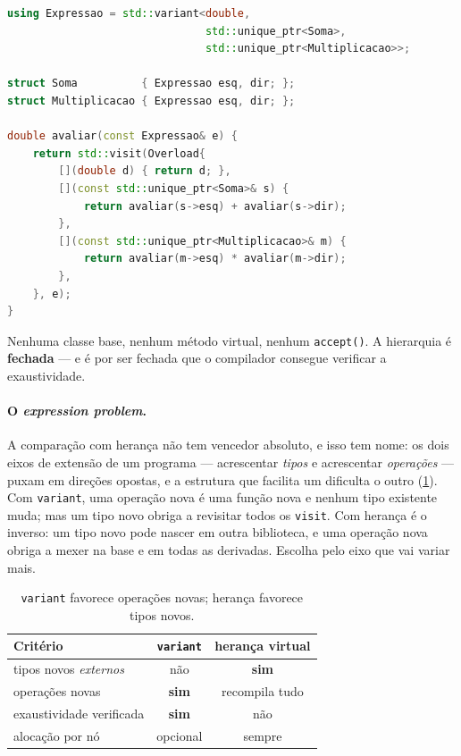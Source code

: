 \begin{lstlisting}[style=bt, language=C++,
    caption={Uma árvore de expressão sem uma única função virtual, em
             \texttt{src/vocabulary\_types/demo\_variant.hpp}.}]
using Expressao = std::variant<double,
                               std::unique_ptr<Soma>,
                               std::unique_ptr<Multiplicacao>>;

struct Soma          { Expressao esq, dir; };
struct Multiplicacao { Expressao esq, dir; };

double avaliar(const Expressao& e) {
    return std::visit(Overload{
        [](double d) { return d; },
        [](const std::unique_ptr<Soma>& s) {
            return avaliar(s->esq) + avaliar(s->dir);
        },
        [](const std::unique_ptr<Multiplicacao>& m) {
            return avaliar(m->esq) * avaliar(m->dir);
        },
    }, e);
}
\end{lstlisting}

Nenhuma classe base, nenhum método virtual, nenhum \texttt{accept()}. A
hierarquia é \textbf{fechada} --- e é por ser fechada que o compilador consegue
verificar a exaustividade.

\paragraph{O \emph{expression problem}.} A comparação com herança não tem
vencedor absoluto, e isso tem nome: os dois eixos de extensão de um programa ---
acrescentar \emph{tipos} e acrescentar \emph{operações} --- puxam em direções
opostas, e a estrutura que facilita um dificulta o outro
(\cref{tab:variant-vs-heranca}). Com \texttt{variant}, uma operação nova é uma
função nova e nenhum tipo existente muda; mas um tipo novo obriga a revisitar
todos os \texttt{visit}. Com herança é o inverso: um tipo novo pode nascer em
outra biblioteca, e uma operação nova obriga a mexer na base e em todas as
derivadas. Escolha pelo eixo que vai variar mais.

\begin{table}[htbp]
\centering
\caption{\texttt{variant} favorece operações novas; herança favorece tipos novos.}
\label{tab:variant-vs-heranca}
\footnotesize
\begin{tabular}{@{}lcc@{}}
\toprule
\textbf{Critério} & \texttt{variant} & \textbf{herança virtual} \\
\midrule
tipos novos \emph{externos} & não          & \textbf{sim} \\
operações novas             & \textbf{sim} & recompila tudo \\
exaustividade verificada    & \textbf{sim} & não \\
alocação por nó             & opcional     & sempre \\
\bottomrule
\end{tabular}
\end{table}

